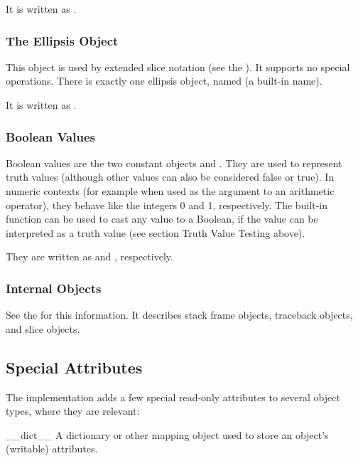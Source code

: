 It is written as .


\subsubsection{The Ellipsis Object \label{bltin-ellipsis-object}}

This object is used by extended slice notation (see the
).  It supports no
special operations.  There is exactly one ellipsis object, named
 (a built-in name).

It is written as .

\subsubsection{Boolean Values}

Boolean values are the two constant objects  and
.  They are used to represent truth values (although other
values can also be considered false or true).  In numeric contexts
(for example when used as the argument to an arithmetic operator),
they behave like the integers 0 and 1, respectively.  The built-in
function  can be used to cast any value to a Boolean,
if the value can be interpreted as a truth value (see section Truth
Value Testing above).

They are written as  and , respectively.


\subsubsection{Internal Objects \label{typesinternal}}

See the  for this
information.  It describes stack frame objects, traceback objects, and
slice objects.


\subsection{Special Attributes \label{specialattrs}}

The implementation adds a few special read-only attributes to several
object types, where they are relevant:

\begin{memberdesc}[object]{__dict__}
A dictionary or other mapping object used to store an
object's (writable) attributes.
\end{memberdesc}

